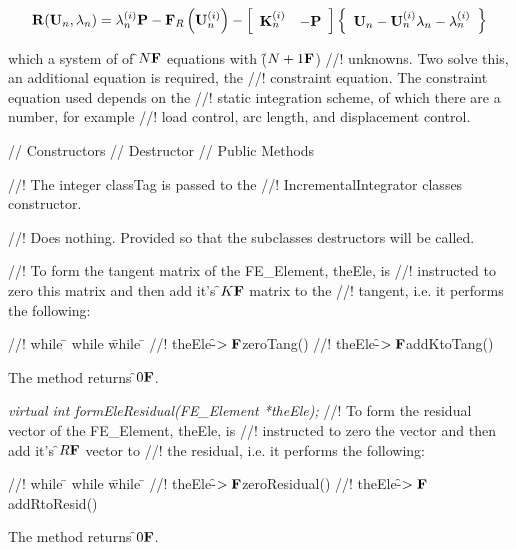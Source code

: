 \begin{equation} 
{\bf R}({\bf U}_{n},\lambda_n) = \lambda_n^{(i)} {\bf P} 
 - {\bf F}_{R}\left({\bf U}_{n}^{(i)} \right) - \left[
\begin{array}{cc}
{\bf K}_n^{(i)} & -{\bf P}
\end{array} \right] 
\left\{
\begin{array}{c}
{\bf U}_{n} - {\bf U}_{n}^{(i)} 
\lambda_n - \lambda_n^{(i)} 
\end{array} \right\}
\label{staticFormTaylor}
\end{equation} 

\noindent which  a system of of \f$N{\bf F}$ equations with (\f$N+1{\bf F}$)
//! unknowns. Two solve this, an additional equation is required, the
//! constraint equation. The constraint equation used depends on the
//! static integration scheme, of which there are a number, for example
//! load control, arc length, and displacement control.

\pagebreak
{}
\indent\indent // Constructors
\indent{}
\indent\indent // Destructor
\indent{}
\indent\indent // Public Methods
\indent{}
\indent{}
\indent{}
\indent{}
\indent{}

//! The integer \p classTag is passed to the
//! IncrementalIntegrator classes constructor.

//! Does nothing. Provided so that the subclasses destructors will be called.

//! To form the tangent matrix of the FE\_Element, \p theEle, is
//! instructed to zero this matrix and then add it's \f$K{\bf F}$ matrix to the
//! tangent, i.e. it performs the following: 
\begin{tabbing}
//! while \= \+ while \= while \= \kill
//! theEle-\f$>{\bf F}$zeroTang()
//! theEle-\f$>{\bf F}$addKtoTang() 
\end{tabbing}
\noindent The method returns \f$0{\bf F}$.

{\em virtual int formEleResidual(FE\_Element *theEle);}
//! To form the residual vector of the FE\_Element, \p theEle, is
//! instructed to zero the vector and then add it's \f$R{\bf F}$ vector to
//! the residual, i.e. it performs the following: 
\begin{tabbing}
//! while \= \+ while \= while \= \kill
//! theEle-\f$>{\bf F}$zeroResidual()
//! theEle-\f$>{\bf F}$addRtoResid() 
\end{tabbing}
\noindent The method returns \f$0{\bf F}$.

